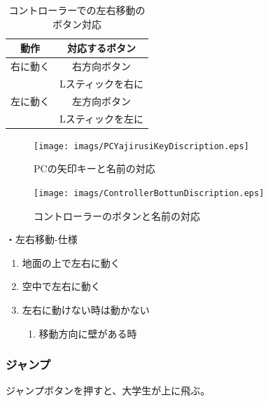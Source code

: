 \documentclass[12pt]{jsarticle}
\begin{document}
\begin{table}[htbp]
  \centering
  \caption{コントローラーでの左右移動のボタン対応}
  \begin{tabular}{c|c}
    \hline
    動作 & 対応するボタン\\
    \hline
    右に動く & 右方向ボタン \\
      & Lスティックを右に \\
    \hline
    左に動く & 左方向ボタン \\
      & Lスティックを左に \\
    \hline
  \end{tabular}
\end{table}

\newpage

\begin{figure}[htbp]
  \begin{center}
    \texttt{[image: imags/PCYajirusiKeyDiscription.eps]}
  \end{center}
  \caption{PCの矢印キーと名前の対応}
\end{figure}
\begin{figure}
    \begin{center}
    \texttt{[image: imags/ControllerBottunDiscription.eps]}
  \end{center}
  \caption{コントローラーのボタンと名前の対応}
\end{figure}

\newpage

・左右移動-仕様
\begin{enumerate}
  \item 地面の上で左右に動く
  \item 空中で左右に動く
  \item 左右に動けない時は動かない
  \begin{enumerate}
    \item 移動方向に壁がある時
  \end{enumerate}
\end{enumerate}

\newpage

\subsubsection{ジャンプ}

ジャンプボタンを押すと、大学生が上に飛ぶ。
\end{document}
